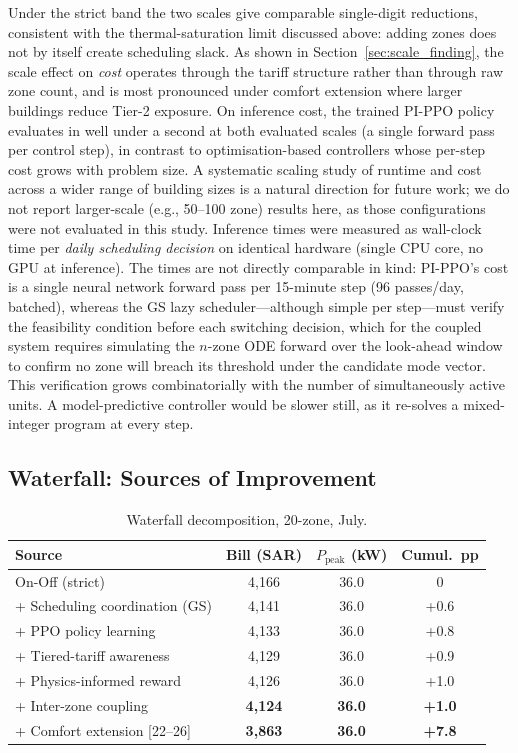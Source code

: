 \documentclass[12pt,a4paper]{article}
\begin{document}
Under the strict band the two scales give comparable single-digit reductions, consistent with the thermal-saturation limit discussed above: adding zones does not by itself create scheduling slack. As shown in Section~\ref{sec:scale_finding}, the scale effect on \emph{cost} operates through the tariff structure rather than through raw zone count, and is most pronounced under comfort extension where larger buildings reduce Tier-2 exposure. On inference cost, the trained PI-PPO policy evaluates in well under a second at both evaluated scales (a single forward pass per control step), in contrast to optimisation-based controllers whose per-step cost grows with problem size. A systematic scaling study of runtime and cost across a wider range of building sizes is a natural direction for future work; we do not report larger-scale (e.g., 50--100 zone) results here, as those configurations were not evaluated in this study. Inference times were measured as wall-clock time per \textit{daily scheduling decision} on identical hardware (single CPU core, no GPU at inference). The times are not directly comparable in kind: PI-PPO's cost is a single neural network forward pass per 15-minute step (96 passes/day, batched), whereas the GS lazy scheduler---although simple per step---must verify the feasibility condition before each switching decision, which for the coupled system requires simulating the $n$-zone ODE forward over the look-ahead window to confirm no zone will breach its threshold under the candidate mode vector. This verification grows combinatorially with the number of simultaneously active units. A model-predictive controller would be slower still, as it re-solves a mixed-integer program at every step.

\subsection{Waterfall: Sources of Improvement}

\begin{table}[H]
\centering
\caption{Waterfall decomposition, 20-zone, July.}
\label{tab:waterfall}
\begin{tabular*}{\textwidth}{@{\extracolsep{\fill}}lccc@{}}
\toprule
\textbf{Source} & \textbf{Bill} (SAR) & $P_{\text{peak}}$ (kW) & \textbf{Cumul.\ pp} \\
\midrule
On-Off (strict) & 4{,}166 & 36.0 & 0 \\
+ Scheduling coordination (GS) & 4{,}141 & 36.0 & +0.6 \\
+ PPO policy learning & 4{,}133 & 36.0 & +0.8 \\
+ Tiered-tariff awareness & 4{,}129 & 36.0 & +0.9 \\
+ Physics-informed reward & 4{,}126 & 36.0 & +1.0 \\
+ Inter-zone coupling & \textbf{4{,}124} & \textbf{36.0} & \textbf{+1.0} \\
\midrule
+ Comfort extension [22--26] & \textbf{3{,}863} & \textbf{36.0} & \textbf{+7.8} \\
\bottomrule
\end{tabular*}
\end{table}
\end{document}
